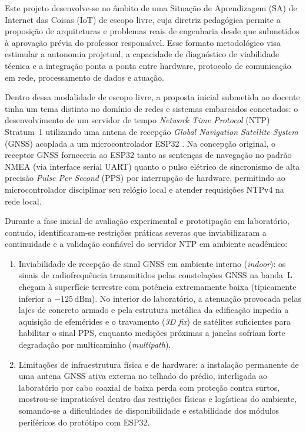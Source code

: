 Este projeto desenvolve-se no âmbito de uma Situação de Aprendizagem (SA) de Internet das Coisas (IoT) de escopo livre, cuja diretriz pedagógica permite a proposição de arquiteturas e problemas reais de engenharia desde que submetidos à aprovação prévia do professor responsável. Esse formato metodológico visa estimular a autonomia projetual, a capacidade de diagnóstico de viabilidade técnica e a integração ponta a ponta entre hardware, protocolo de comunicação em rede, processamento de dados e atuação.

Dentro dessa modalidade de escopo livre, a proposta inicial submetida ao docente tinha um tema distinto no domínio de redes e sistemas embarcados conectados: o desenvolvimento de um servidor de tempo \textit{Network Time Protocol} (NTP) Stratum~1 utilizando uma antena de recepção \textit{Global Navigation Satellite System} (GNSS) acoplada a um microcontrolador ESP32 \cite{rfc5905_ntp, espressif_esp32}. Na concepção original, o receptor GNSS forneceria ao ESP32 tanto as sentenças de navegação no padrão NMEA (via interface serial UART) quanto o pulso elétrico de sincronismo de alta precisão \textit{Pulse Per Second} (PPS) por interrupção de hardware, permitindo ao microcontrolador disciplinar seu relógio local e atender requisições NTPv4 na rede local.

Durante a fase inicial de avaliação experimental e prototipação em laboratório, contudo, identificaram-se restrições práticas severas que inviabilizaram a continuidade e a validação confiável do servidor NTP em ambiente acadêmico:
\begin{enumerate}
  \item Inviabilidade de recepção de sinal GNSS em ambiente interno (\textit{indoor}): os sinais de radiofrequência transmitidos pelas constelações GNSS na banda~L chegam à superfície terrestre com potência extremamente baixa (tipicamente inferior a $-125\,\text{dBm}$). No interior do laboratório, a atenuação provocada pelas lajes de concreto armado e pela estrutura metálica da edificação impedia a aquisição de efemérides e o travamento (\textit{3D fix}) de satélites suficientes para habilitar o sinal PPS, enquanto medições próximas a janelas sofriam forte degradação por multicaminho (\textit{multipath}).
  \item Limitações de infraestrutura física e de hardware: a instalação permanente de uma antena GNSS ativa externa no telhado do prédio, interligada ao laboratório por cabo coaxial de baixa perda com proteção contra surtos, mostrou-se impraticável dentro das restrições físicas e logísticas do ambiente, somando-se a dificuldades de disponibilidade e estabilidade dos módulos periféricos do protótipo com ESP32.
\end{enumerate}


